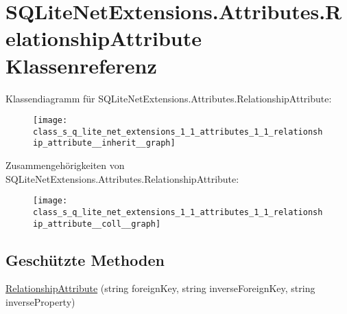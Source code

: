 \hypertarget{class_s_q_lite_net_extensions_1_1_attributes_1_1_relationship_attribute}{}\section{S\+Q\+Lite\+Net\+Extensions.\+Attributes.\+Relationship\+Attribute Klassenreferenz}
\label{class_s_q_lite_net_extensions_1_1_attributes_1_1_relationship_attribute}


Klassendiagramm für S\+Q\+Lite\+Net\+Extensions.\+Attributes.\+Relationship\+Attribute\+:\nopagebreak
\begin{figure}[H]
\begin{center}
\leavevmode
\texttt{[image: class\_s\_q\_lite\_net\_extensions\_1\_1\_attributes\_1\_1\_relationship\_attribute\_\_inherit\_\_graph]}
\end{center}
\end{figure}


Zusammengehörigkeiten von S\+Q\+Lite\+Net\+Extensions.\+Attributes.\+Relationship\+Attribute\+:\nopagebreak
\begin{figure}[H]
\begin{center}
\leavevmode
\texttt{[image: class\_s\_q\_lite\_net\_extensions\_1\_1\_attributes\_1\_1\_relationship\_attribute\_\_coll\_\_graph]}
\end{center}
\end{figure}
\subsection*{Geschützte Methoden}
\begin{DoxyCompactItemize}
\item 
\mbox{\hyperlink{class_s_q_lite_net_extensions_1_1_attributes_1_1_relationship_attribute_a95f43e2f5d7c48df08f2c89e353e06fd}{Relationship\+Attribute}} (string foreign\+Key, string inverse\+Foreign\+Key, string inverse\+Property)
\end{DoxyCompactItemize}
